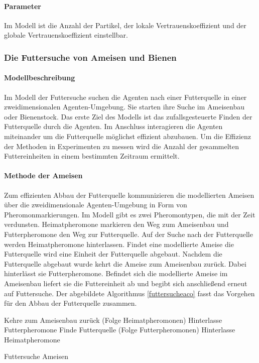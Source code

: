 \documentclass[a4paper, 11pt]{article}
\begin{document}
\paragraph{Parameter}
Im Modell ist die Anzahl der Partikel, der lokale Vertrauenskoeffizient und der globale Vertrauenskoeffizient einstellbar.
\subsubsection{Die Futtersuche von Ameisen und Bienen}
\paragraph{Modellbeschreibung}
Im Modell der Futtersuche suchen die Agenten nach einer Futterquelle in einer zweidimensionalen Agenten-Umgebung. Sie starten ihre Suche im Ameisenbau oder Bienenstock. Das erste Ziel des Modells ist das zufallsgesteuerte Finden der Futterquelle durch die Agenten. Im Anschluss interagieren die Agenten miteinander um die Futterquelle möglichst effizient abzubauen. Um die Effizienz der Methoden in Experimenten zu messen wird die Anzahl der gesammelten Futtereinheiten in einem bestimmten Zeitraum ermittelt. 
\paragraph{Methode der Ameisen}
Zum effizienten Abbau der Futterquelle kommunizieren die modellierten Ameisen über die zweidimensionale Agenten-Umgebung in Form von Pheromonmarkierungen. Im Modell gibt es zwei Pheromontypen, die mit der Zeit verdunsten. Heimatpheromone markieren den Weg zum Ameisenbau und Futterpheromone den Weg zur Futterquelle. Auf der Suche nach der Futterquelle werden Heimatpheromone hinterlassen. Findet eine modellierte Ameise die Futterquelle wird eine Einheit der Futterquelle abgebaut. Nachdem die Futterquelle abgebaut wurde kehrt die Ameise zum Ameisenbau zurück. Dabei hinterlässt sie Futterpheromone. Befindet sich die modellierte Ameise im Ameisenbau liefert sie die Futtereinheit ab und begibt sich anschließend erneut auf Futtersuche. Der abgebildete Algorithmus \ref{futtersucheaco} fasst das Vorgehen für den Abbau der Futterquelle zusammen.
\begin{framed}
	\begin{algorithm}[H]
			{
				Kehre zum Ameisenbau zurück (Folge Heimatpheromonen)\;
				Hinterlasse Futterpheromone\;
			}
			{
				Finde Futterquelle (Folge Futterpheromonen)\;
				Hinterlasse Heimatpheromone\;
			}
		\caption{Futtersuche Ameisen}
		\label{futtersucheaco}
	\end{algorithm}
\end{framed}
\end{document}
